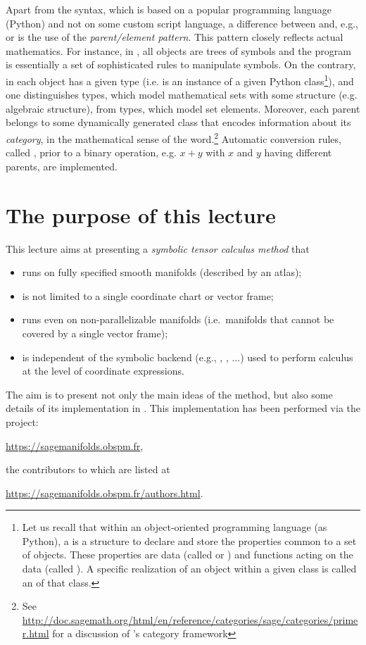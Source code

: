 Apart from the syntax, which is based on a popular programming language
(Python) and not on some custom script
language, a difference between \Sage{} and, e.g.,  or 
is the use of the \emph{parent/element pattern}. This pattern closely
reflects actual mathematics.
For instance, in , all objects
are trees of symbols and the program is essentially a set of
sophisticated rules to manipulate symbols. On the contrary, in \Sage{}
each object has a given type (i.e. is an instance of a given
Python class\footnote{Let us
recall that within an object-oriented programming language (as Python),
a  is a structure to declare and store the
properties common to a set of objects. These properties
are data (called
 or ) and functions acting
on the data (called ). A specific realization of an object
within a given class is called an  of that class.}),
and one distinguishes  types, which model mathematical
sets with some structure (e.g. algebraic structure), from  types,
which model set elements. Moreover, each parent belongs to some
dynamically generated class that encodes information
about its \emph{category}, in the mathematical sense of the word.\footnote{See
\url{http://doc.sagemath.org/html/en/reference/categories/sage/categories/primer.html}
for a discussion of \Sage{}'s category framework}
Automatic conversion rules, called ,
prior to a binary operation, e.g. $x+y$ with $x$ and $y$ having different
parents, are implemented.

\section{The purpose of this lecture}

This lecture aims at presenting
a \emph{symbolic tensor calculus method} that
\begin{itemize}
\item runs on fully specified smooth manifolds (described by an atlas);
\item is not limited to a single coordinate chart or vector frame;
\item runs even on non-parallelizable manifolds (i.e.\ manifolds that cannot
be covered by a single vector frame);
\item is independent of the symbolic backend (e.g., ,
, ...) used to perform calculus at the level of coordinate expressions.
\end{itemize}
The aim is to present not only the main ideas of the method, but also some details of its implementation in \Sage{}. This implementation has been
performed via the  project:
\begin{center}
\url{https://sagemanifolds.obspm.fr},
\end{center}
the contributors to which are listed at
\begin{center}
\url{https://sagemanifolds.obspm.fr/authors.html}.
\end{center}
